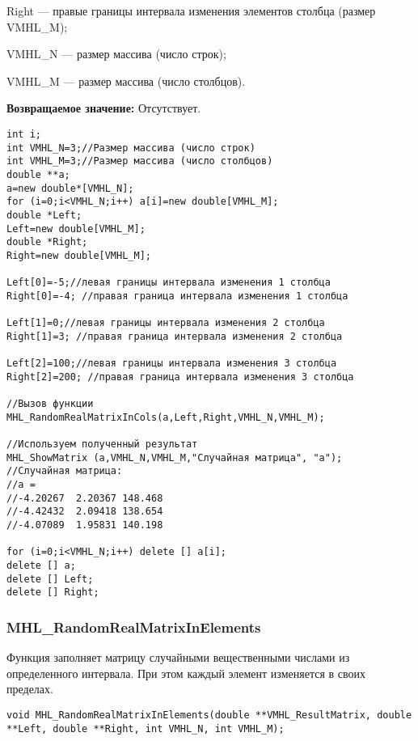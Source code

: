 \documentclass[a4paper,12pt]{article}
\begin{document}
 Right --- правые границы интервала изменения элементов столбца (размер VMHL\_M);
 
 VMHL\_N --- размер массива (число строк);
 
 VMHL\_M --- размер массива (число столбцов).

\textbf{Возвращаемое значение:}
Отсутствует.


\begin{lstlisting}[label=code_use_MHL_RandomRealMatrixInCols,caption=Пример использования]
int i;
int VMHL_N=3;//Размер массива (число строк)
int VMHL_M=3;//Размер массива (число столбцов)
double **a;
a=new double*[VMHL_N];
for (i=0;i<VMHL_N;i++) a[i]=new double[VMHL_M];
double *Left;
Left=new double[VMHL_M];
double *Right;
Right=new double[VMHL_M];

Left[0]=-5;//левая границы интервала изменения 1 столбца
Right[0]=-4; //правая граница интервала изменения 1 столбца

Left[1]=0;//левая границы интервала изменения 2 столбца
Right[1]=3; //правая граница интервала изменения 2 столбца

Left[2]=100;//левая границы интервала изменения 3 столбца
Right[2]=200; //правая граница интервала изменения 3 столбца

//Вызов функции
MHL_RandomRealMatrixInCols(a,Left,Right,VMHL_N,VMHL_M);

//Используем полученный результат
MHL_ShowMatrix (a,VMHL_N,VMHL_M,"Случайная матрица", "a");
//Случайная матрица:
//a =
//-4.20267	2.20367	148.468
//-4.42432	2.09418	138.654
//-4.07089	1.95831	140.198

for (i=0;i<VMHL_N;i++) delete [] a[i];
delete [] a;
delete [] Left;
delete [] Right;
\end{lstlisting}

\subsubsection{MHL\_RandomRealMatrixInElements}\label{MHL_RandomRealMatrixInElements}

Функция заполняет матрицу случайными вещественными числами из определенного интервала. При этом каждый элемент изменяется в своих пределах.


\begin{lstlisting}[label=code_syntax_MHL_RandomRealMatrixInElements,caption=Синтаксис]
void MHL_RandomRealMatrixInElements(double **VMHL_ResultMatrix, double **Left, double **Right, int VMHL_N, int VMHL_M);
\end{lstlisting}
\end{document}
